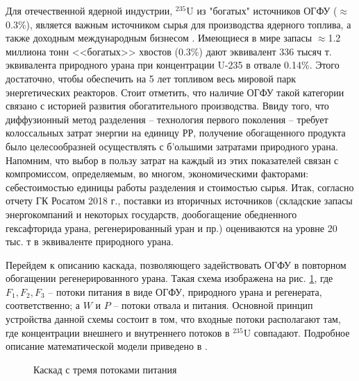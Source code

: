 Для отечественной ядерной индустрии, $^{235}$U из "богатых" источников ОГФУ ($\approx$0.3\%), является важным источником сырья для производства ядерного топлива, а также доходным международным бизнесом \cite{oecdManagementDepletedUranium2001}.
Имеющиеся в мире запасы $\approx$1.2 миллиона тонн <<богатых>> хвостов (0.3\%) дают эквивалент 336 тысяч т. эквивалента природного урана при концентрации U-235 в отвале 0.14\%. Этого достаточно, чтобы обеспечить на 5 лет топливом весь мировой парк энергетических реакторов.
Стоит отметить, что наличие ОГФУ такой категории связано с историей развития обогатительного производства. Ввиду того, что диффузионный метод разделения -- технология первого поколения -- требует колоссальных затрат энергии на единицу РР, получение обогащенного продукта было целесообразней осуществлять с б'ольшими затратами природного урана.
Напомним, что выбор в пользу затрат на каждый из этих показателей связан с компромиссом, определяемым, во многом, экономическими факторами: себестоимостью единицы работы разделения и стоимостью сырья. 
Итак, согласно отчету ГК Росатом 2018 г., поставки из вторичных источников (складские запасы энергокомпаний и некоторых государств, дообогащение обедненного гексафторида урана, регенерированный уран и пр.) оцениваются на уровне 20 тыс. т в эквиваленте природного урана.

Перейдем к описанию каскада, позволяющего задействовать ОГФУ в повторном обогащении регенерированного урана.
Такая схема изображена на рис. \ref{fig:3_inputs}, где $F_{1}, F_{2}, F_{3}$ -- потоки питания в виде ОГФУ, природного урана и регенерата, соответственно; а $W$ и $P$ -- потоки отвала и питания.
Основной принцип устройства данной схемы состоит в том, что входные потоки располагают там, где концентрации внешнего и внутреннего потоков в $^{235}$U совпадают.
Подробное описание математической модели приведено в \cite{smirnovEnrichmentRegeneratedUranium2014}.

\begin{figure}[ht]
  \caption{Каскад с тремя потоками питания}\label{fig:3_inputs}
\end{figure}

